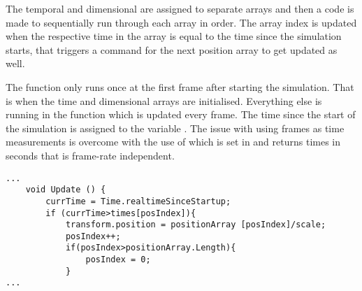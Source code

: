 The temporal and dimensional are assigned to separate arrays and then a code is made to sequentially run through each array in order. The array index is updated when the respective time in the array is equal to the time since the simulation starts, that triggers a command for the next position array to get updated as well.

The  function only runs once at the first frame after starting the simulation. That is when the time and dimensional arrays are initialised. Everything else is running in the function  which is updated every frame. The time since the start of the simulation is assigned to the variable . The issue with using frames as time measurements is overcome with the use of  which is set in  and returns times in seconds that is frame-rate independent. 

\bigskip
\begin{code1}
\begin{verbatim}
...
	void Update () {
		currTime = Time.realtimeSinceStartup;
		if (currTime>times[posIndex]){
			transform.position = positionArray [posIndex]/scale;
			posIndex++;
			if(posIndex>positionArray.Length){
				posIndex = 0;
			}
...
\end{verbatim}
\label{code:c-code}
\end{code1}